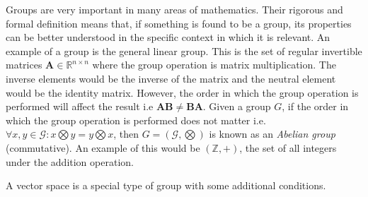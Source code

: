 \documentclass[a4paper,12pt]{book}
\newcommand{\set}[1]{\mathcal{#1}}
\newcommand{\operation}{\bigotimes}
\newcommand{\matrx}[1]{\bm{#1}}
\newcommand{\real}{\mathbb{R}}
\newcommand{\integers}{\mathbb{Z}}
\newcommand{\italic}[1]{\textit{#1}}
\begin{document}
	Groups are very important in many areas of mathematics. Their rigorous and formal definition means that, if something is found to be a group, its properties can be better understood in the specific context in which it is relevant.
	An example of a group is the general linear group. This is the set of regular invertible matrices $ \matrx{A} \in \real^{n \times n} $ where the group operation is matrix multiplication. The inverse elements would be the inverse of the matrix and the neutral element would be the identity matrix. However, the order in which the group operation is performed will affect the result i.e $ \matrx{AB} \ne \matrx{BA} $. 
	Given a group $ G $, if the order in which the group operation is performed does not matter i.e. $ \forall x, y \in \set{G} : x \operation y = y \operation x $, then $ G = (\set{G}, \operation) $ is known as an \italic{Abelian group} (commutative). An example of this would be $ (\integers, +) $, the set of all integers under the addition operation.
	
	
	A vector space \cite[page 37]{mml_book} is a special type of group with some additional conditions. 
	
\end{document}
